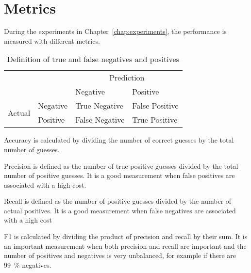 \section{Metrics}\label{sec:metrics} %
During the experiments in Chapter~\ref{chap:experiments}, the performance is measured with different metrics.

\begin{table}[ht]
  \centering
  \caption{Definition of true and false negatives and positives} %
  \begin{tabular}{ll|l|l} %
                            & \multicolumn{1}{c}{} & \multicolumn{2}{c}{Prediction}                  \\
                            &                      & Negative                       & Positive       \\ \cline{2-4}
    \multirow{2}{*}{Actual} & Negative             & True Negative                  & False Positive \\ \cline{2-4}
                            & Positive             & False Negative                 & True Positive  \\
  \end{tabular}\label{table:true-false-neg-pos}
\end{table}

Accuracy is calculated by dividing the number of correct guesses by the total number of guesses. %

Precision is defined as the number of true positive guesses divided by the total number of positive guesses. It is a good measurement when false positives are associated with a high cost. %

Recall is defined as the number of positive guesses divided by the number of actual positives. It is a good measurement when false negatives are associated with a high cost %

F1 is calculated by dividing the product of precision and recall by their sum. It is an important measurement when both precision and recall are important and the number of positives and negatives is very unbalanced, for example if there are \SI{99}{\percent} negatives.
